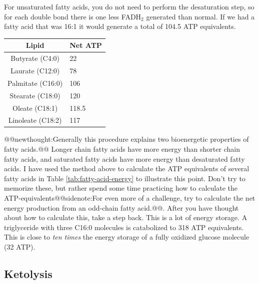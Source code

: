 \documentclass{tufte-handout}
\makeatletter
\def\newthought#1{@@newthought:#1@@}
\def\sidenote#1{@@sidenote:#1@@}
\makeatother
\begin{document}
For unsaturated fatty acids, you do not need to perform the desaturation step, so for each double bond there is one less FADH$_2$ generated than normal.  If we had a fatty acid that was 16:1 it would generate a total of 104.5 ATP equivalents.

\begin{margintable}
\centering
\caption{ATP equivalents of some fatty acids.}
\label{tab:fatty-acid-energy}
\begin{tabular}{@{}cl@{}}
\toprule
\textbf{Lipid} & \textbf{Net ATP} \\ \midrule
Butyrate (C4:0)           &  22                \\
Laurate (C12:0)          & 78                    \\
Palmitate (C16:0)          & 106               \\
Stearate (C18:0)          & 120              \\
Oleate (C18:1)          & 118.5              \\
Linoleate (C18:2)          & 117            \\ \bottomrule
\end{tabular}
\end{margintable}

\newthought{Generally this procedure explains two bioenergetic properties of fatty acids.}  Longer chain fatty acids have more energy than shorter chain fatty acids, and saturated fatty acids have more energy than desaturated fatty acids.  I have used the method above to calculate the ATP equivalents of several fatty acids in Table \ref{tab:fatty-acid-energy} to illustrate this point.  Don't try to memorize these, but rather spend some time practicing how to calculate the ATP-equivalents\sidenote{For even more of a challenge, try to calculate the net energy production from an odd-chain fatty acid.}.  After you have thought about how to calculate this, take a step back.  This is a lot of energy storage.  A triglyceride with three C16:0 molecules is catabolized to 318 ATP equivalents.  This is close to \emph{ten times} the energy storage of a fully oxidized glucose molecule (32 ATP).

\subsection{Ketolysis}
\end{document}
